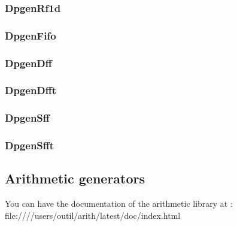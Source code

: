 \documentclass[12pt]{article}
\begin{document}
        \subsubsection{DpgenRf1d}
        
        \subsubsection{DpgenFifo}
        
        \subsubsection{DpgenDff}
        
        \subsubsection{DpgenDfft}
        
        \subsubsection{DpgenSff}
        
        \subsubsection{DpgenSfft}
        

\begin{htmlonly}  
    \subsection{Arithmetic generators}

You can have the documentation of the arithmetic library at :\\
file:////users/outil/arith/latest/doc/index.html
\end{htmlonly}
\end{document}
